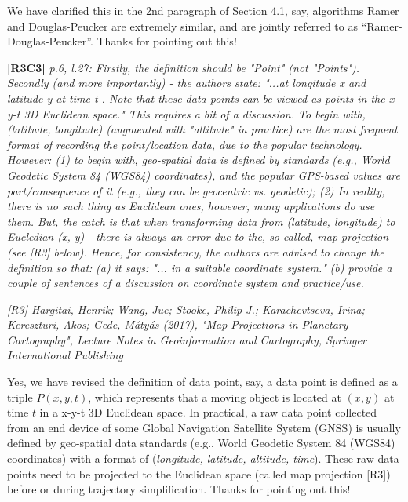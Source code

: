 \documentclass{letter}
\begin{document}
We have clarified this in the 2nd paragraph of Section 4.1, say, algorithms Ramer and Douglas-Peucker are extremely similar, and are jointly referred to as ``Ramer-Douglas-Peucker''.
Thanks for pointing out this!



\textbf{[R3C3]} \emph{p.6, l.27: Firstly, the definition should be "Point" (not "Points"). Secondly (and more importantly) - the authors state: "...at longitude x and latitude y at time t . Note that these data points can be viewed as points in the x-y-t 3D Euclidean space." This requires a bit of a discussion. To begin with, (latitude, longitude) (augmented with "altitude" in practice) are the most frequent format of recording the point/location data, due to the popular technology. However: (1) to begin with, geo-spatial data is defined by standards (e.g., World Geodetic System 84 (WGS84) coordinates), and the popular GPS-based values are part/consequence of it (e.g., they can be geocentric vs. geodetic); (2) In reality, there is no such thing as Euclidean ones, however, many applications do use them. But, the catch is that when transforming data from (latitude, longitude) to Eucledian (x, y) - there is always an error due to the, so called, map projection (see [R3] below).}
%	
\emph{Hence, for consistency, the authors are advised to change the definition so that:}
%	
\emph{(a) it says: "... in a suitable coordinate system."}
%	
\emph{(b) provide a couple of sentences of a discussion on coordinate system and practice/use.}

\emph{[R3] Hargitai, Henrik; Wang, Jue; Stooke, Philip J.; Karachevtseva, Irina; Kereszturi, Akos; Gede, Mátyás (2017), "Map Projections in Planetary Cartography", Lecture Notes in Geoinformation and Cartography, Springer International Publishing}

Yes, we have revised the definition of data point, say, a data point is defined as a triple $P(x, y, t)$, {which represents that a moving object is located at {$(x, y)$} at time $t$ in a x-y-t 3D Euclidean space. 
In practical, a raw data point collected from an end device of some Global Navigation Satellite System (GNSS) is usually defined by geo-spatial data standards (e.g., World Geodetic System 84 (WGS84) coordinates) with a format of ({\em longitude, latitude, altitude, time}). These raw data points need to be projected to the Euclidean space (called map projection [R3]) before or during trajectory simplification.} 
Thanks for pointing out this!
\end{document}
